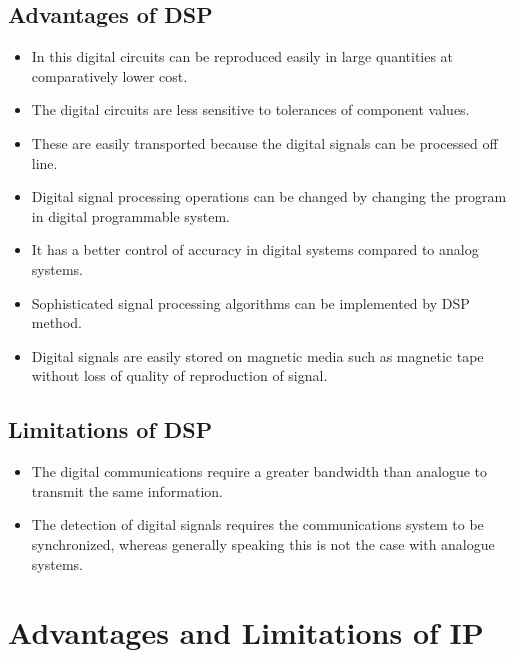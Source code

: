 \documentclass{article}
\begin{document}
\begin{multicols}{2}
        \subsection{Advantages of DSP}
            \begin{itemize}
                \item In this digital circuits can be reproduced easily in large quantities at comparatively lower cost.
                \item The digital circuits are less sensitive to tolerances of component values.
                \item These are easily transported because the digital signals can be processed off line.
                \item Digital signal processing operations can be changed by changing the program in digital programmable system.
                \item It has a better control of accuracy in digital systems compared to analog systems.
                \item Sophisticated signal processing algorithms can be implemented by DSP method.
                \item Digital signals are easily stored on magnetic media such as magnetic tape without loss of quality of reproduction of signal.
            \end{itemize}
        \subsection{Limitations of DSP}
            \begin{itemize}
                \item The digital communications require a greater bandwidth than analogue to transmit the same information.
                \item The detection of digital signals requires the communications system to be synchronized, whereas generally speaking this is not the case with analogue systems.
            \end{itemize}
    \section{Advantages and Limitations of IP} 

\end{multicols}
\end{document}
